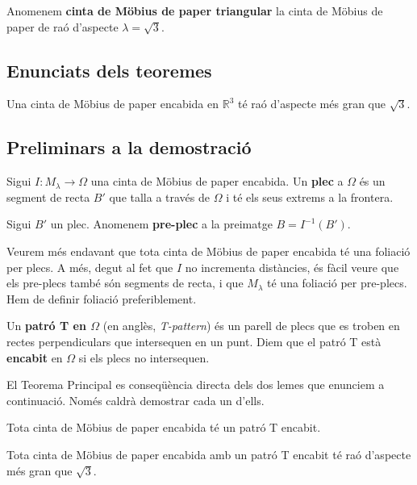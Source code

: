 \begin{ex}
    Anomenem \textbf{cinta de Möbius de paper triangular} la cinta de Möbius de paper de raó d'aspecte $\lambda = \sqrt{3}$.
\end{ex}

\subsection{Enunciats dels teoremes}
\begin{teo}\label{teo:Main Schwartz}
    Una cinta de Möbius de paper encabida en $\mathbb R^3$ té raó d'aspecte més gran que $\sqrt{3}$.
\end{teo}


\subsection{Preliminars a la demostració}
\begin{defi}
    Sigui $I:M_\lambda\to\Omega$ una cinta de Möbius de paper encabida. Un \textbf{plec} a $\Omega$ és un segment de recta $B'$ que talla a través de $\Omega$ i té els seus extrems a la frontera.
\end{defi}

\begin{defi}
    Sigui $B'$ un plec. Anomenem \textbf{pre-plec} a la preimatge $B=I^{-1}(B')$.
\end{defi}
Veurem més endavant que tota cinta de Möbius de paper encabida té una foliació per plecs. A més, degut al fet que $I$ no incrementa distàncies, és fàcil veure que els pre-plecs també són segments de recta, i que $M_\lambda$ té una foliació per pre-plecs. {\color{blue} Hem de definir foliació preferiblement.}
\begin{defi}
    Un \textbf{patró T en $\Omega$} (en anglès, \textit{T-pattern}) és un parell de plecs que es troben en rectes perpendiculars que intersequen en un punt. Diem que el patró T està \textbf{encabit} en $\Omega$ si els plecs no intersequen.
\end{defi}

El Teorema Principal es conseqüència directa dels dos lemes que enunciem a continuació. Només caldrà demostrar cada un d'ells.
\begin{lema}[\textbf{T}]\label{lema T}
    Tota cinta de Möbius de paper encabida té un patró T encabit.
\end{lema}

\begin{lema}[\textbf{G}]\label{lema G}
    Tota cinta de Möbius de paper encabida amb un patró T encabit té raó d'aspecte més gran que $\sqrt{3}$.
\end{lema}

